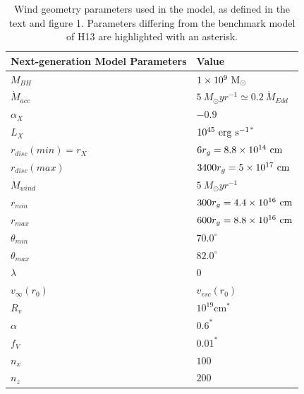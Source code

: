 \documentclass[useAMS,usenatbib]{mn2e_x}
\begin{document}
\begin{table}
\begin{tabular}{p{3cm}p{4cm}}
\hline Next-generation Model Parameters 	&	 Value \\ 
\hline \hline 
$M_{BH}$ 	 &	 $1\times 10^9~\rm{M_{\odot}}$ \\ 
$\dot{M}_{acc}$ 	 &	 $5~M_{\odot}yr^{-1} \simeq 0.2~\dot{M}_{Edd}$\\ 
$\alpha_X$ 	 &	 $-0.9$ \\ 
$L_{X} $ 	 &	 $10^{45}~\rm{erg~s^{-1}}$$^*$ \\ 
$r_{disc}(min)=r_{X}$   &	 $6r_g=8.8\times10^{14}~{\rm cm}$ \\ 
$r_{disc}(max)$   &	 $3400r_g = 5\times10^{17}~{\rm cm}$ \\ 
$\dot{M}_{wind}$  &	 $5~M_{\odot}yr^{-1}$ \\ 
$r_{min}$ 	&	 $300r_{g} = 4.4\times10^{16}~{\rm cm}$\\ 
$r_{max}$ 	&	 $600r_{g} = 8.8\times10^{16}~{\rm cm}$ \\ 
$\theta_{min}$ 	&	 $70.0^{\circ}$ \\ 
$\theta_{max}$ 	&	 $82.0^{\circ}$ \\ 
$\lambda$ 	&	 $0$ \\ 
$v_{\infty}(r_0)$ 	&	 $v_{esc}(r_0)$ \\ 
$R_v$  	        &	 $10^{19}$cm$^*$ \\ 
$\alpha$ 	&	 $0.6^*$ \\
$f_V$ 	&	 $0.01^*$  \\
$n_x$ 	&	 $100$  \\
$n_z$ 	&	 $200$  \\
\hline 
\end{tabular}
\caption{Wind geometry parameters 
used in the model, as defined in the text and figure 1.
Parameters differing from the benchmark model of H13 are 
highlighted with an asterisk.}
\label{wind_param}
\end{table}
\end{document}
